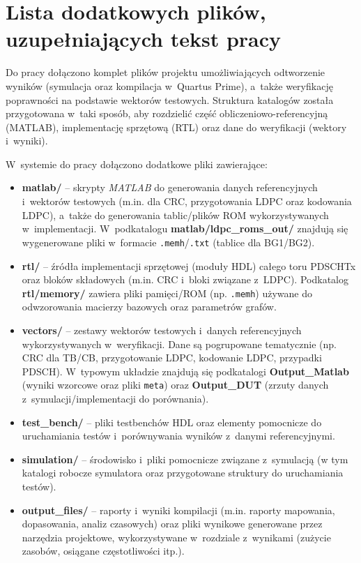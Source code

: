 \chapter{Lista dodatkowych plików, uzupełniających tekst pracy}

Do pracy dołączono komplet plików projektu umożliwiających odtworzenie wyników (symulacja oraz kompilacja w~Quartus Prime), a~także weryfikację poprawności na podstawie wektorów testowych.
Struktura katalogów została przygotowana w~taki sposób, aby rozdzielić część obliczeniowo-referencyjną (MATLAB), implementację sprzętową (RTL) oraz dane do weryfikacji (wektory i~wyniki).

W~systemie do pracy dołączono dodatkowe pliki zawierające:
\begin{itemize}
  \item \textbf{matlab/} -- skrypty \textit{MATLAB} do generowania danych referencyjnych i~wektorów testowych (m.in. dla CRC, przygotowania LDPC oraz kodowania LDPC), a~także do generowania tablic/plików ROM wykorzystywanych w~implementacji.
        W~podkatalogu \textbf{matlab/ldpc\_roms\_out/} znajdują się wygenerowane pliki w~formacie \texttt{.memh}/\texttt{.txt} (tablice dla BG1/BG2).

  \item \textbf{rtl/} -- źródła implementacji sprzętowej (moduły HDL) całego toru PDSCHTx oraz bloków składowych (m.in. CRC i~bloki związane z~LDPC).
        Podkatalog \textbf{rtl/memory/} zawiera pliki pamięci/ROM (np. \texttt{.memh}) używane do odwzorowania macierzy bazowych oraz parametrów grafów.

  \item \textbf{vectors/} -- zestawy wektorów testowych i~danych referencyjnych wykorzystywanych w~weryfikacji.
        Dane są pogrupowane tematycznie (np. CRC dla TB/CB, przygotowanie LDPC, kodowanie LDPC, przypadki PDSCH).
        W~typowym układzie znajdują się podkatalogi \textbf{Output\_Matlab} (wyniki wzorcowe oraz pliki \texttt{meta}) oraz \textbf{Output\_DUT} (zrzuty danych z~symulacji/implementacji do porównania).

  \item \textbf{test\_bench/} -- pliki testbenchów HDL oraz elementy pomocnicze do uruchamiania testów i~porównywania wyników z~danymi referencyjnymi.

  \item \textbf{simulation/} -- środowisko i~pliki pomocnicze związane z~symulacją (w tym katalogi robocze symulatora oraz przygotowane struktury do uruchamiania testów).

  \item \textbf{output\_files/} -- raporty i~wyniki kompilacji (m.in. raporty mapowania, dopasowania, analiz czasowych) oraz pliki wynikowe generowane przez narzędzia projektowe, wykorzystywane w~rozdziale z~wynikami (zużycie zasobów, osiągane częstotliwości itp.).
\end{itemize}
